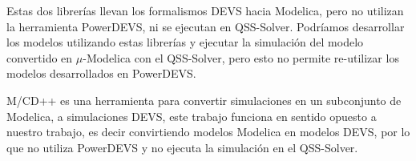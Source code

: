 Estas dos librerías llevan los formalismos DEVS hacia Modelica, pero no utilizan la herramienta PowerDEVS, ni se ejecutan en QSS-Solver.
Podríamos desarrollar los modelos utilizando estas librerías y ejecutar la simulación del modelo convertido en $\mu$-Modelica con el QSS-Solver, pero esto no permite re-utilizar los modelos desarrollados en PowerDEVS.


M/CD++ \cite{DAbreuW05} es una herramienta para convertir simulaciones en un subconjunto de Modelica, a simulaciones DEVS, este trabajo funciona en sentido opuesto a nuestro trabajo, es decir convirtiendo modelos Modelica en modelos DEVS, por lo que no utiliza PowerDEVS y no ejecuta la simulación en el QSS-Solver\cite{Ber12}.

